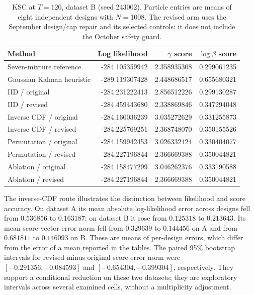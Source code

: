 \begin{table}[htbp]
\centering
\small
\setlength{\tabcolsep}{5pt}
\begin{tabular}{lrrr}
\toprule
Method & Log likelihood & \(\gamma\) score & \(\log\beta\) score\\
\midrule
Seven-mixture reference & -284.105359942 & 2.358935308 & 0.299061235\\
Gaussian Kalman heuristic & -289.119307428 & 2.448686517 & 0.655680321\\
IID / original & -284.231222413 & 2.856512226 & 0.299130287\\
IID / revised & -284.459443680 & 2.338869846 & 0.347294048\\
Inverse CDF / original & -284.160036239 & 3.035272629 & 0.331255873\\
Inverse CDF / revised & -284.225769251 & 2.368748070 & 0.350155526\\
Permutation / original & -284.159942453 & 3.026332424 & 0.330404077\\
Permutation / revised & -284.227196844 & 2.366669388 & 0.350044821\\
Ablation / original & -284.158477299 & 3.046262376 & 0.333190588\\
Ablation / revised & -284.227196844 & 2.366669388 & 0.350044821\\
\bottomrule
\end{tabular}
\caption{KSC at \(T=120\), dataset B (seed 243002).
Particle entries are means of eight independent designs with \(N=1008\).
The revised arm uses the September design/cap repair and its selected controls;
it does not include the October safety guard.}
\label{tab:bf-eot-hm-ksc-120-b}
\end{table}

The inverse-CDF route illustrates the distinction between likelihood and score
accuracy.  On dataset A its mean absolute log-likelihood error across designs
fell from \(0.536856\) to \(0.163187\); on dataset B it rose from
\(0.125318\) to \(0.213643\).  Its mean score-vector error norm fell from
\(0.329639\) to \(0.144456\) on A and from \(0.681811\) to \(0.146093\) on B.
These are means of per-design errors, which differ from the error of a mean
reported in the tables.  The paired 95\% bootstrap intervals for revised
minus original score-error norm were \([-0.291356,-0.084593]\) and
\([-0.654304,-0.399304]\), respectively.  They support a conditional reduction
on these two datasets; they are exploratory intervals across several examined
cells, without a multiplicity adjustment.

